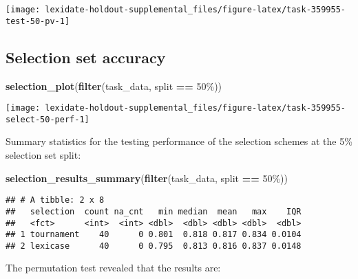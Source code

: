 \documentclass[
]{book}
\newenvironment{Shaded}{\begin{snugshade}}{\end{snugshade}}
\newcommand{\FunctionTok}[1]{\textcolor[rgb]{0.13,0.29,0.53}{\textbf{#1}}}
\newcommand{\NormalTok}[1]{#1}
\newcommand{\SpecialCharTok}[1]{\textcolor[rgb]{0.81,0.36,0.00}{\textbf{#1}}}
\newcommand{\StringTok}[1]{\textcolor[rgb]{0.31,0.60,0.02}{#1}}
\begin{document}
\texttt{[image: lexidate-holdout-supplemental\_files/figure-latex/task-359955-test-50-pv-1]}

\hypertarget{selection-set-accuracy-12}{%
\subsection{Selection set accuracy}\label{selection-set-accuracy-12}}

\begin{Shaded}
\begin{Highlighting}[]
\FunctionTok{selection\_plot}\NormalTok{(}\FunctionTok{filter}\NormalTok{(task\_data, split }\SpecialCharTok{==} \StringTok{\textquotesingle{}50\%\textquotesingle{}}\NormalTok{))}
\end{Highlighting}
\end{Shaded}

\texttt{[image: lexidate-holdout-supplemental\_files/figure-latex/task-359955-select-50-perf-1]}

Summary statistics for the testing performance of the selection schemes at the 5\% selection set split:

\begin{Shaded}
\begin{Highlighting}[]
\FunctionTok{selection\_results\_summary}\NormalTok{(}\FunctionTok{filter}\NormalTok{(task\_data, split }\SpecialCharTok{==} \StringTok{\textquotesingle{}50\%\textquotesingle{}}\NormalTok{))}
\end{Highlighting}
\end{Shaded}

\begin{verbatim}
## # A tibble: 2 x 8
##   selection  count na_cnt   min median  mean   max    IQR
##   <fct>      <int>  <int> <dbl>  <dbl> <dbl> <dbl>  <dbl>
## 1 tournament    40      0 0.801  0.818 0.817 0.834 0.0104
## 2 lexicase      40      0 0.795  0.813 0.816 0.837 0.0148
\end{verbatim}

The permutation test revealed that the results are:
\end{document}
